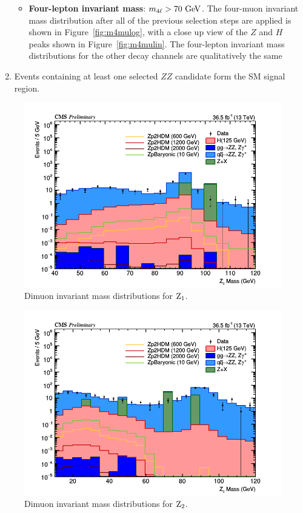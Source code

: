 \begin{enumerate}
\begin{itemize}
  \item {\bf Four-lepton invariant mass}: $m_{4\ell} > 70~\mathrm{Ge\kern -0.1em V}$. The four-muon invariant mass distribution after all of the previous selection steps are applied is shown in Figure~\ref{fig:m4mulog}, with a close up view of the $Z$ and $H$ peaks shown in Figure~\ref{fig:m4mulin}. The four-lepton invariant mass distributions for the other decay channels are qualitatively the same
  \end{itemize}	
\item Events containing at least one selected $ZZ$ candidate form the SM signal region.
\end{enumerate}	

\begin{figure}[tbh]
\centering
\includegraphics[width=5.5in]{figures/hist_hMZ1_8.png}
    \caption{Dimuon invariant mass distributions for ${\rm Z_1}$.}
    \label{fig:dimuonz1}
\end{figure}

\begin{figure}[tbh]
\centering
\includegraphics[width=5.5in]{figures/hist_hMZ2_8.png}
    \caption{Dimuon invariant mass distributions for ${\rm Z_2}$.}
    \label{fig:dimuonz2}
\end{figure}

